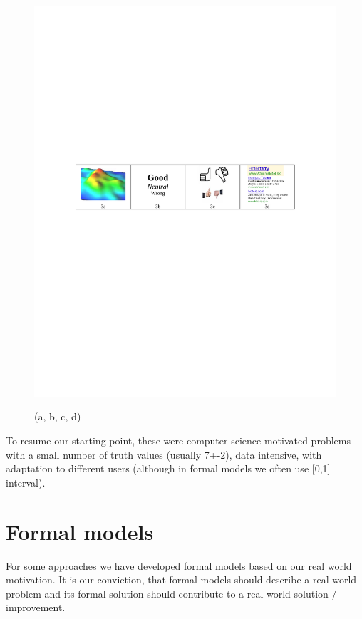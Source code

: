\begin{figure}[htbp]
	\centering
		\includegraphics[width=1.00\textwidth]{img/img3}
	\label{fig:img3}
	\caption{(a, b, c, d)}
\end{figure}

 

     To resume our starting point, these were computer science motivated problems with a small number of truth values (usually 7+-2), data intensive, with adaptation to different users (although in formal models we often use [0,1] interval).
     
\section{Formal models}

For some approaches we have developed formal models based on our real world motivation. It is our conviction, that formal models should describe a real world problem and its formal solution should contribute to a real world solution / improvement. 

